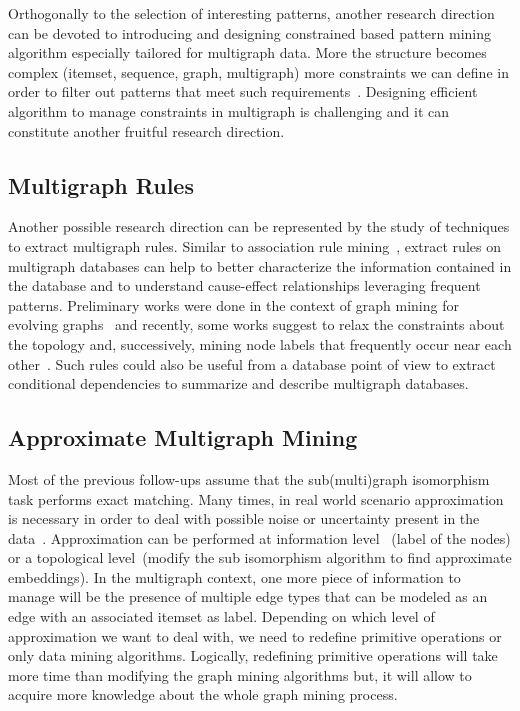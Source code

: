 Orthogonally to the selection of interesting patterns, another research direction can be devoted to introducing and designing constrained based pattern mining algorithm especially tailored for multigraph data. More the structure becomes complex (itemset, sequence, graph, multigraph) more constraints we can define in order to filter out patterns that meet such requirements~\cite{ZhuQLYHY11}. Designing efficient algorithm to manage constraints in multigraph is challenging and it can constitute another fruitful research direction.

\subsection{Multigraph Rules}
Another possible research direction can be represented by the study of techniques to extract multigraph rules. Similar to association rule mining~\cite{CoenenLA04}, extract rules on multigraph databases can help to better characterize the information contained in the database and to understand cause-effect relationships leveraging frequent patterns. Preliminary works were done in the context of graph mining for evolving graphs~\cite{BringmannBBG10} and recently, some works suggest to relax the constraints about the topology and, successively, mining node labels that frequently occur near each other~\cite{HendrickxCMNLG15}. Such rules could also be useful from a database point of view to extract conditional dependencies to summarize and describe multigraph databases.


\subsection{Approximate Multigraph Mining} 
Most of the previous follow-ups assume that the sub(multi)graph isomorphism task performs exact matching. Many times, in real world scenario approximation is necessary in order to deal with possible noise or uncertainty present in the data~\cite{Morales-GonzalezAARM14,AnchuriZBGS13,SilvaMZ12}. Approximation can be performed at information level~\cite{AnchuriZBGS13,CakmakO08} (label of the nodes) or a topological level~\cite{ZhangYJ10}(modify the sub isomorphism algorithm to find approximate embeddings). In the multigraph context, one more piece of information to manage will be the presence of multiple edge types that can be modeled as an edge with an associated itemset as label.
Depending on which level of approximation we want to deal with, we need to redefine primitive operations or only data mining algorithms. Logically, redefining primitive operations will take more time than modifying the graph mining algorithms but, it will allow to acquire more knowledge about the whole graph mining process.


